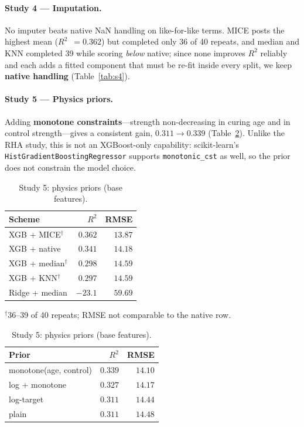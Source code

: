 \documentclass[11pt]{article}
\newcommand{\R}{$R^2$}
\begin{document}
\paragraph{Study 4 --- Imputation.}
No imputer beats native NaN handling on like-for-like terms. MICE posts the highest
mean (\R{}~$=0.362$) but completed only 36 of 40 repeats, and median and KNN
completed 39 while scoring \emph{below} native; since none improves \R{} reliably
and each adds a fitted component that must be re-fit inside every split, we keep
\textbf{native handling} (Table~\ref{tab:s4}).

\paragraph{Study 5 --- Physics priors.}
Adding \textbf{monotone constraints}---strength non-decreasing in curing age and in
control strength---gives a consistent gain, $0.311\rightarrow0.339$
(Table~\ref{tab:s5}). Unlike the RHA study, this is not an XGBoost-only capability:
scikit-learn's \texttt{HistGradientBoostingRegressor} supports
\texttt{monotonic\_cst} as well, so the prior does not constrain the model choice.

\begin{table}[H]\centering\small
\begin{minipage}{0.46\textwidth}\centering
\caption{Study 4: imputation (framing C).}
\label{tab:s4}
\begin{tabular}{lrr}
\toprule
Scheme & \R{} & RMSE \\
\midrule
XGB + MICE$^{\dagger}$ & $0.362$ & $13.87$ \\
\rowcolor{green!12}XGB + native & $0.341$ & $14.18$ \\
XGB + median$^{\dagger}$ & $0.298$ & $14.59$ \\
XGB + KNN$^{\dagger}$ & $0.297$ & $14.59$ \\
Ridge + median & $-23.1$ & $59.69$ \\
\bottomrule
\end{tabular}

{\scriptsize $^{\dagger}$36--39 of 40 repeats; RMSE not comparable to the
native row.}
\end{minipage}\hfill
\begin{minipage}{0.5\textwidth}\centering
\caption{Study 5: physics priors (base features).}
\label{tab:s5}
\begin{tabular}{lrr}
\toprule
Prior & \R{} & RMSE \\
\midrule
\rowcolor{green!12}monotone(age, control) & $0.339$ & $14.10$ \\
log + monotone & $0.327$ & $14.17$ \\
log-target & $0.311$ & $14.44$ \\
plain & $0.311$ & $14.48$ \\
\bottomrule
\end{tabular}
\end{minipage}
\end{table}
\end{document}
